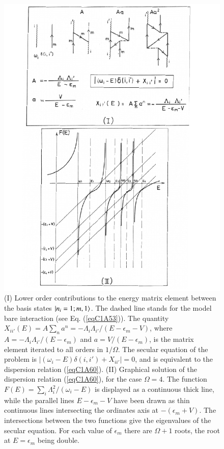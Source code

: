     \begin{figure}
    \centerline {
    \includegraphics*[width=12cm]{introduccion/figs/fig21}
    }
    \caption{(I) Lower order contributions to the energy matrix element between the basis states $|{n_i=1;m,1} \rangle$. The dashed line stands for the model bare interaction (see Eq. (\ref{eqC1A53})). The quantity $X_{ii'}(E)=A\sum_na^n=-\Lambda_i\Lambda_{i'}/(E-\epsilon_m-V)$, where $A=-\Lambda_i\Lambda_{i'}/(E-\epsilon_m)$ and $a=V/(E-\epsilon_m)$, is the matrix element iterated to all orders in $1/\Omega$. The secular equation of the problem is $|(\omega_i-E)\delta(i,i')+X_{ii'}|=0$, and is equivalent to the dispersion relation (\ref{eqC1A60}). (II) Graphical solution of the dispersion relation (\ref{eqC1A60}), for the case $\Omega=4$. The function $F(E)=\sum_i\Lambda_i^2/(\omega_i-E)$ is displayed as a continuous thick line, while the parallel lines $E-\epsilon_m-V$ have been drawn as thin continuous lines intersecting the ordinates axis at $-(\epsilon_m+V)$. The intersections between the two functions give the eigenvalues of the secular equation. For each value of $\epsilon_m$ there are $\Omega+1$ roots, the root at $E=\epsilon_m$ being double.}
    \label{figC1A4}
    \end{figure}

